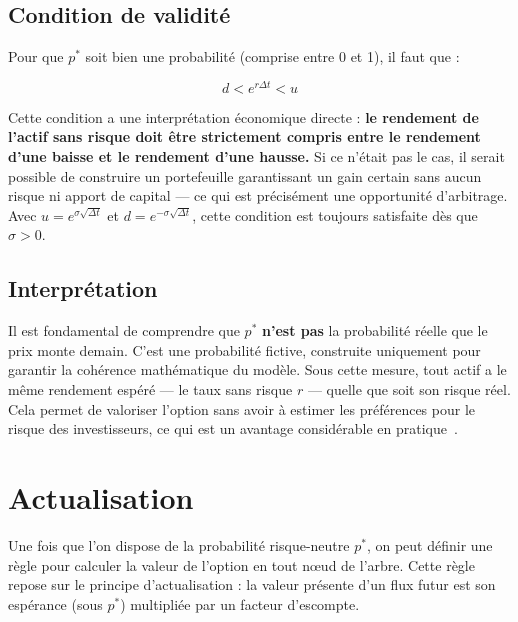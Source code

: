 \documentclass[11pt]{report}
\begin{document}
\subsection*{Condition de validité}

Pour que $p^*$ soit bien une probabilité (comprise entre 0 et 1), il faut
que :

\begin{equation}
    d < e^{r \Delta t} < u
\end{equation}

Cette condition a une interprétation économique directe : \textbf{le
rendement de l'actif sans risque doit être strictement compris entre le
rendement d'une baisse et le rendement d'une hausse.} Si ce n'était pas
le cas, il serait possible de construire un portefeuille garantissant un
gain certain sans aucun risque ni apport de capital — ce qui est précisément
une opportunité d'arbitrage. Avec $u = e^{\sigma\sqrt{\Delta t}}$ et
$d = e^{-\sigma\sqrt{\Delta t}}$, cette condition est toujours satisfaite
dès que $\sigma > 0$.

\subsection*{Interprétation}

Il est fondamental de comprendre que $p^*$ \textbf{n'est pas} la probabilité
réelle que le prix monte demain. C'est une probabilité fictive, construite
uniquement pour garantir la cohérence mathématique du modèle. Sous cette
mesure, tout actif a le même rendement espéré — le taux sans risque $r$ —
quelle que soit son risque réel. Cela permet de valoriser l'option sans avoir
à estimer les préférences pour le risque des investisseurs, ce qui est un
avantage considérable en pratique~\cite{hull2018}.

\section{Actualisation}

Une fois que l'on dispose de la probabilité risque-neutre $p^*$, on peut
définir une règle pour calculer la valeur de l'option en tout nœud de l'arbre.
Cette règle repose sur le principe d'actualisation : la valeur présente d'un
flux futur est son espérance (sous $p^*$) multipliée par un facteur
d'escompte.

\medskip

\noindent{}
\end{document}
